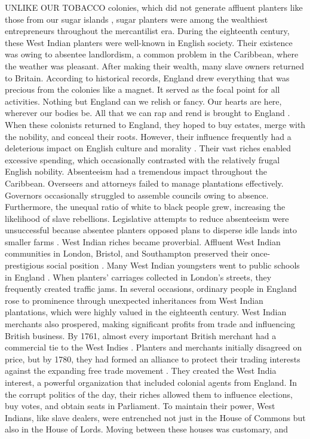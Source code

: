 UNLIKE OUR TOBACCO colonies, which did not generate affluent planters like those from our sugar islands , sugar planters were among the wealthiest entrepreneurs throughout the mercantilist era. During the eighteenth century, these West Indian planters were well-known in English society. Their existence was owing to absentee landlordism, a common problem in the Caribbean, where the weather was pleasant. After making their wealth, many slave owners returned to Britain. According to historical records, England drew everything that was precious from the colonies like a magnet. It served as the focal point for all activities. Nothing but England can we relish or fancy. Our hearts are here, wherever our bodies be. All that we can rap and rend is brought to England . When these colonists returned to England, they hoped to buy estates, merge with the nobility, and conceal their roots. However, their influence frequently had a deleterious impact on English culture and morality . Their vast riches enabled excessive spending, which occasionally contrasted with the relatively frugal English nobility. Absenteeism had a tremendous impact throughout the Caribbean. Overseers and attorneys failed to manage plantations effectively. Governors occasionally struggled to assemble councils owing to absence. Furthermore, the unequal ratio of white to black people grew, increasing the likelihood of slave rebellions. Legislative attempts to reduce absenteeism were unsuccessful because absentee planters opposed plans to disperse idle lands into smaller farms . West Indian riches became proverbial. Affluent West Indian communities in London, Bristol, and Southampton preserved their once-prestigious social position . Many West Indian youngsters went to public schools in England . When planters' carriages collected in London's streets, they frequently created traffic jams. In several occasions, ordinary people in England rose to prominence through unexpected inheritances from West Indian plantations, which were highly valued in the eighteenth century. West Indian merchants also prospered, making significant profits from trade and influencing British business. By 1761, almost every important British merchant had a commercial tie to the West Indies . Planters and merchants initially disagreed on price, but by 1780, they had formed an alliance to protect their trading interests against the expanding free trade movement . They created the West India interest, a powerful organization that included colonial agents from England. In the corrupt politics of the day, their riches allowed them to influence elections, buy votes, and obtain seats in Parliament. To maintain their power, West Indians, like slave dealers, were entrenched not just in the House of Commons but also in the House of Lords. Moving between these houses was customary, and 